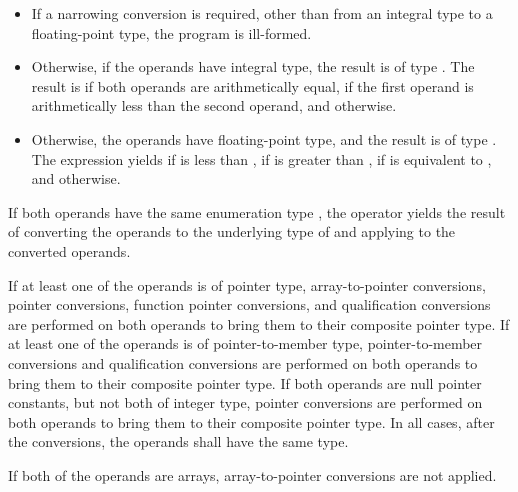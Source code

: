 \begin{itemize}
\item
If a narrowing conversion is required,
other than from an integral type to a floating-point type,
the program is ill-formed.

\item
Otherwise, if the operands have integral type,
the result is of type .
The result is
if both operands are arithmetically equal,
if the first operand is arithmetically
less than the second operand,
and
otherwise.
\item
Otherwise, the operands have floating-point type, and
the result is of type .
The expression  yields
if  is less than ,
if  is greater than ,
if  is equivalent to ,
and
 otherwise.
\end{itemize}

\pnum
If both operands have the same enumeration type ,
the operator yields the result of
converting the operands to the underlying type of 
and applying \tcode{<=>} to the converted operands.

\pnum
If at least one of the operands is of pointer type,
array-to-pointer conversions,
pointer conversions,
function pointer conversions,
and
qualification conversions
are performed on both operands
to bring them to their composite pointer type.
%
If at least one of the operands is of pointer-to-member type,
pointer-to-member conversions
and
qualification conversions
are performed on both operands
to bring them to their composite pointer type.
%
If both operands are null pointer constants,
but not both of integer type,
pointer conversions
are performed on both operands
to bring them to their composite pointer type.
%
In all cases, after the conversions, the operands shall have the same type.
\begin{note}
If both of the operands are arrays,
array-to-pointer conversions are not applied.
\end{note}

